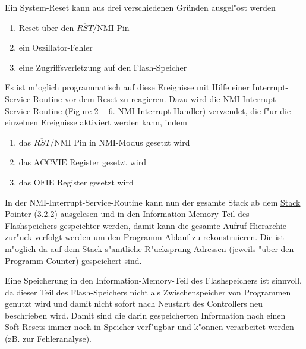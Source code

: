 \documentclass[11pt,a4paper,ngerman]{article}
\begin{document}
\begin{description}

\begin{samepage}
Ein System-Reset kann aus drei verschiedenen Gründen ausgel"ost werden
\begin{enumerate}
\item Reset über den $\overline{RST}/{\text{NMI}}$ Pin
\item ein Oszillator-Fehler
\item eine Zugriffsverletzung auf den Flash-Speicher
\end{enumerate}
\end{samepage}
\begin{samepage}
Es ist m"oglich programmatisch auf diese Ereignisse mit Hilfe einer Interrupt-Service-Routine vor dem Reset zu reagieren. Dazu wird die NMI-Interrupt-Service-Routine (\href{http://hwp.mi.fu-berlin.de/intern/19606-P-MPP/Dokumentation/slau049f.pdf}{Figure $2-6.$ NMI Interrupt Handler}) verwendet, die f"ur die einzelnen Ereignisse aktiviert werden kann, indem
\begin{enumerate}
\item das $\overline{RST}/{\text{NMI}}$ Pin in NMI-Modus gesetzt wird
\item das $\text{ACCVIE}$ Register gesetzt wird
\item das $\text{OFIE}$ Register gesetzt wird
\end{enumerate}
\end{samepage}

In der NMI-Interrupt-Service-Routine kann nun der gesamte Stack ab dem \href{http://hwp.mi.fu-berlin.de/intern/19606-P-MPP/Dokumentation/slau049f.pdf}{Stack Pointer (3.2.2)} ausgelesen und in den Information-Memory-Teil des Flashspeichers gespeichter werden, damit kann die gesamte Aufruf-Hierarchie zur"uck verfolgt werden um den Programm-Ablauf zu rekonstruieren.
Die ist m"oglich da auf dem Stack s"amtliche R"ucksprung-Adressen (jeweils "uber den Programm-Counter) gespeichert sind. 

Eine Speicherung in den Information-Memory-Teil des Flashspeichers ist sinnvoll, da dieser Teil des Flash-Speichers nicht als Zwischenspeicher von Programmen genutzt wird und damit nicht sofort nach Neustart des Controllers neu beschrieben wird. Damit sind die darin gespeicherten Information nach einen Soft-Resets immer noch in Speicher verf"ugbar und k"onnen verarbeitet werden (zB. zur Fehleranalyse).

\end{description}
\end{document}
